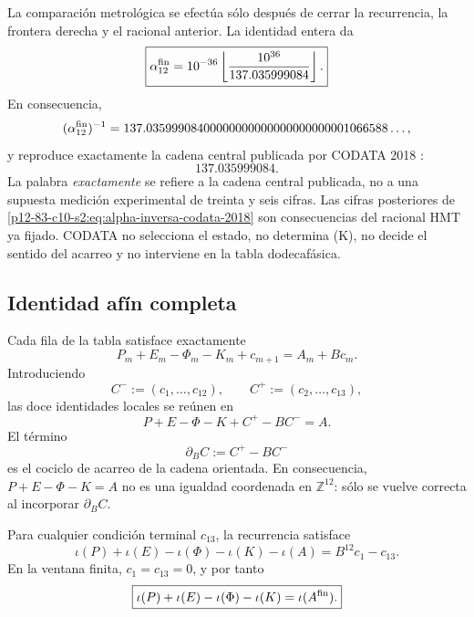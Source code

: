 La comparación metrológica se efectúa sólo después de cerrar la recurrencia,
la frontera derecha y el racional anterior. La identidad entera da
\begin{equation}
 \boxed{
 \alpha_{12}^{\rm fin}
 =10^{-36}
 \left\lfloor\frac{10^{36}}{137.035999084}\right\rfloor.}
 \label{p12-83-c10-s2:eq:alpha-finita-codata-2018}
\end{equation}
En consecuencia,
\begin{equation}
 (\alpha_{12}^{\rm fin})^{-1}
 =137.03599908400000000000000000000001066588\ldots,
 \label{p12-83-c10-s2:eq:alpha-inversa-codata-2018}
\end{equation}
y reproduce exactamente la cadena central publicada por CODATA 2018
\cite{Tiesinga2021CODATA}:
\[
 \boxed{137.035999084.}
\]
La palabra \emph{exactamente} se refiere a la cadena central publicada, no
a una supuesta medición experimental de treinta y seis cifras. Las cifras
posteriores de \eqref{p12-83-c10-s2:eq:alpha-inversa-codata-2018} son consecuencias del
racional HMT ya fijado. CODATA no selecciona el estado, no determina (K),
no decide el sentido del acarreo y no interviene en la tabla dodecafásica.

\subsection{Identidad afín completa}

Cada fila de la tabla satisface exactamente
\begin{equation}
 P_m+E_m-\Phi_m-K_m+c_{m+1}
 =A_m+Bc_m.
 \label{p12-83-c10-s2:eq:identidad-local-acarreo-alpha}
\end{equation}
Introduciendo
\[
 C^-:=(c_1,\ldots,c_{12}),
 \qquad
 C^+:=(c_2,\ldots,c_{13}),
\]
las doce identidades locales se reúnen en
\begin{equation}
 \boxed{
 P+E-\Phi-K+C^+-BC^-=A.}
 \label{p12-83-c10-s2:eq:identidad-afin-vectorial-alpha}
\end{equation}
El término
\[
 \partial_BC:=C^+-BC^-
\]
es el cociclo de acarreo de la cadena orientada. En consecuencia,
\(P+E-\Phi-K=A\) no es una igualdad coordenada en
\(\mathbb Z^{12}\): sólo se vuelve correcta al incorporar
\(\partial_BC\).

\begin{theorem}
\label{p12-83-c10-s2:thm:telescopado-acarreos-alpha}
Para cualquier condición terminal \(c_{13}\), la recurrencia satisface
\begin{equation}
 \boxed{
 \iota(P)+\iota(E)-\iota(\Phi)-\iota(K)-\iota(A)
 =B^{12}c_1-c_{13}.}
 \label{p12-83-c10-s2:eq:telescopado-general-alpha}
\end{equation}
En la ventana finita, \(c_1=c_{13}=0\), y por tanto
\begin{equation}
 \boxed{
 \iota(P)+\iota(E)-\iota(\Phi)-\iota(K)
 =\iota(A^{\rm fin}).}
 \label{p12-83-c10-s2:eq:identidad-entera-alpha-finita}
\end{equation}
\end{theorem}

